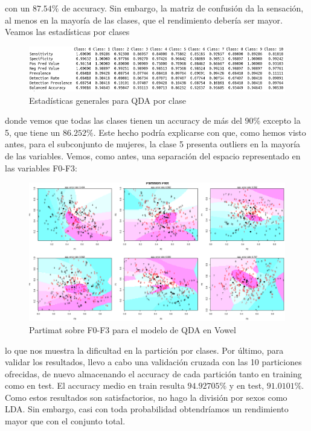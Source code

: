 con un $87.54\%$ de accuracy. Sin embargo, la matriz de confusión da la sensación, al menos en la mayoría de las clases, que el rendimiento debería ser mayor. Veamos las estadísticas por clases

\begin{figure}[H] %
	\centering
	\includegraphics[scale=0.5]{statis-qda-c.png}  %
	\caption{Estadísticas generales para QDA por clase} 
	\label{fig:statis-qda-c}
\end{figure}

donde vemos que todas las clases tienen un accuracy de más del $90\%$ excepto la 5, que tiene un $86.252\%$. Este hecho podría explicarse con que, como hemos visto antes, para el subconjunto de mujeres, la clase 5 presenta outliers en la mayoría de las variables. Vemos, como antes, una separación del espacio representado en las variables F0-F3:

\begin{figure}[H] %
	\centering
	\includegraphics[scale=0.3]{partimat-qda.png}  %
	\caption{Partimat sobre F0-F3 para el modelo de QDA en Vowel} 
	\label{fig:partimat-qda-v}
\end{figure}

lo que nos muestra la dificultad en la partición por clases. Por último, para validar los resultados, llevo a cabo una validación cruzada con las 10 particiones ofrecidas, de nuevo almacenando el accuracy de cada partición tanto en training como en test. El accuracy medio en train resulta $94.92705\%$ y en test, $91.0101\%$. Como estos resultados son satisfactorios, no hago la división por sexos como LDA. Sin embargo, casi con toda probabilidad obtendríamos un rendimiento mayor que con el conjunto total.

